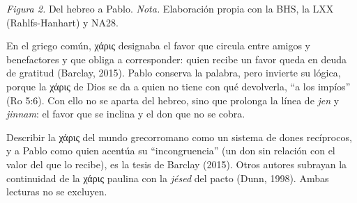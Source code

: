 \documentclass[11pt,letterpaper]{article}
\newcommand{\heb}[1]{\mbox{\foreignlanguage{hebrew}{#1}}}
\newcommand{\grc}[1]{\foreignlanguage{ancientgreek}{#1}}
\begin{document}
\begin{center}
\par
{\footnotesize\color{gris}\textit{Figura 2.} Del hebreo a Pablo. \textit{Nota.} Elaboración propia con la BHS, la LXX (Rahlfs-Hanhart) y NA28.}
\end{center}

En el griego común, \grc{χάρις} designaba el favor que circula entre amigos y benefactores y que obliga a corresponder: quien recibe un favor queda en deuda de gratitud (Barclay, 2015). Pablo conserva la palabra, pero invierte su lógica, porque la \grc{χάρις} de Dios se da a quien no tiene con qué devolverla, ``a los impíos'' (Ro 5:6). Con ello no se aparta del hebreo, sino que prolonga la línea de \emph{jen} y \emph{jinnam}: el favor que se inclina y el don que no se cobra.

\begin{nota}[Precisión]
Describir la \grc{χάρις} del mundo grecorromano como un sistema de dones recíprocos, y a Pablo como quien acentúa su ``incongruencia'' (un don sin relación con el valor del que lo recibe), es la tesis de Barclay (2015). Otros autores subrayan la continuidad de la \grc{χάρις} paulina con la \emph{jésed} del pacto (Dunn, 1998). Ambas lecturas no se excluyen.
\end{nota}
\end{document}
